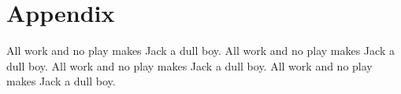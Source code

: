 
%
%

%
%

\section*{Appendix}
\label{sec:appendix}

All work and no play makes Jack a dull boy.
All work and no play makes Jack a dull boy.
All work and no play makes Jack a dull boy.
All work and no play makes Jack a dull boy.
